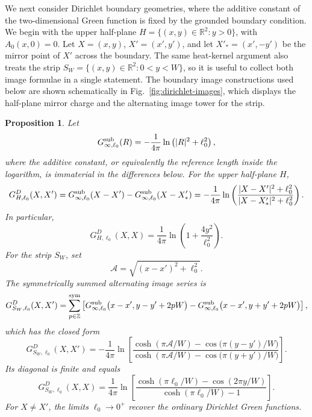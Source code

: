 \documentclass[nopacs,amsmath,amsfonts,amssymb,aps,superscriptaddress]{revtex4}
\newtheorem{proposition}{Proposition}[section]
\begin{document}
We next consider Dirichlet boundary geometries, where the additive constant of the two-dimensional Green function is fixed by the grounded boundary condition. We begin with the upper half-plane
\(H=\{(x,y)\in\mathbb R^2:y>0\}\), with \(A_0(x,0)=0\). Let \(X=(x,y)\), \(X'=(x',y')\), and let \(X'_*=(x',-y')\) be the mirror point of \(X'\) across the boundary. The same heat-kernel argument also treats the strip \(S_W=\{(x,y)\in\mathbb R^2:0<y<W\}\), so it is useful to collect both image formulae in a single statement. The boundary image constructions used below are shown schematically in Fig.~\ref{fig:dirichlet-images}, which displays the half-plane mirror charge and the alternating image tower for the strip. 


\begin{proposition}\label{prop:dirichlet-images}
Let
\begin{equation}
  G_{\infty,\ell_0}^{\rm sub}(R)=-\frac{1}{4\pi}\ln\left(|R|^2+\ell_0^2\right),
\end{equation}
where the additive constant, or equivalently the reference length inside the logarithm, is immaterial in the differences below. For the upper half-plane \(H\),
\begin{equation}\label{GD}
  G_{H,\ell_0}^D(X,X')
  =G_{\infty,\ell_0}^{\rm sub}(X-X')-G_{\infty,\ell_0}^{\rm sub}(X-X'_*)
  =-\frac{1}{4\pi}\ln\left(\frac{|X-X'|^2+\ell_0^2}{|X-X'_*|^2+\ell_0^2}\right).
\end{equation}
In particular,
\begin{equation}
  G_{H,\ell_0}^D(X,X)=\frac{1}{4\pi}\ln\left(1+\frac{4y^2}{\ell_0^2}\right).
\end{equation}
For the strip \(S_W\), set
\begin{equation}
  \mathcal A=\sqrt{(x-x')^2+\ell_0^2}.
\end{equation}
The symmetrically summed alternating image series is
\begin{equation}
  G_{S_W,\ell_0}^D(X,X')=\sum_{p\in\mathbb Z}^{\rm sym}\left[
  G_{\infty,\ell_0}^{\rm sub}\bigl(x-x',y-y'+2pW\bigr)
  -G_{\infty,\ell_0}^{\rm sub}\bigl(x-x',y+y'+2pW\bigr)
  \right],
\end{equation}
which has the closed form
\begin{equation}\label{GFs}
  G_{S_W,\ell_0}^D(X,X')=-\frac{1}{4\pi}\ln\left[
  \frac{\cosh(\pi\mathcal A/W)-\cos\bigl(\pi(y-y')/W\bigr)}
  {\cosh(\pi\mathcal A/W)-\cos\bigl(\pi(y+y')/W\bigr)}\right].
\end{equation}
Its diagonal is finite and equals
\begin{equation}
  G_{S_W,\ell_0}^D(X,X)=\frac{1}{4\pi}\ln\left[
  \frac{\cosh(\pi\ell_0/W)-\cos(2\pi y/W)}{\cosh(\pi\ell_0/W)-1}\right].
\end{equation}
For \(X\neq X'\), the limits \(\ell_0\to0^+\) recover the ordinary Dirichlet Green functions.
\end{proposition}
\end{document}
